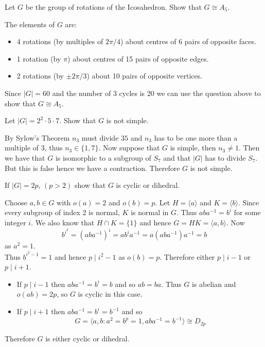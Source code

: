 \documentclass[12pt, answers]{exam}
\begin{document}
\begin{questions}
        \question Let $G$ be the group of rotations of the Icosahedron. Show that $G\cong A_5$.
        \begin{solution}
            The elements of $G$ are:
            \begin{itemize}
                \item 4 rotations (by multiples of $2\pi / 4$) about centres of 6 pairs of opposite faces.
                \item 1 rotation  (by $\pi$) about centres of 15 pairs of opposite edges.
                \item 2 rotations (by $\pm 2\pi / 3$) about 10 pairs of opposite vertices.
            \end{itemize}
            Since $|G| = 60$ and the number of 3 cycles is 20 we can use the question above to show that $G \cong A_5$.
        \end{solution}

        \question Let $|G| = 2^2 \cdot 5 \cdot 7$. Show that $G$ is not simple.
        \begin{solution}
            By Sylow's Theorem $n_3$ must divide $35$ and $n_3$ has to be one more than a multiple of 3, thus
            $n_3 \in \{ 1, 7 \}$. Now suppose that $G$ is simple, then $n_3 \neq 1$. Then we have that $G$ is isomorphic
            to a subgroup of $S_7$ and that $|G|$ has to divide $S_7$. But this is false hence we have a contraction. Therefore
            $G$ is not simple.
        \end{solution}

        \question If $|G| = 2p$, $(p > 2)$ show that $G$ is cyclic or dihedral.
        \begin{solution}
            Choose $a, b \in G$ with $o(a) = 2$ and $o(b) = p$. Let $H = \langle a \rangle$ and $K = \langle b \rangle$.
            Since every subgroup of index 2 is normal, $K$ is normal in $G$. Thus $aba^{-1} = b^i$ for some integer $i$.
            We also know that $H \cap K = \{1\}$ and hence $G = HK = \langle a, b \rangle$. Now
            \[ b^{i^2} = (aba^{-1})^{i} = ab^ia^{-1} = a(aba^{-1})a^{-1} = b\]
            as $a^2 = 1$.\\
            Thus $b^{i^2 - 1} = 1$ and hence $p \mathrel{|} i^2 - 1$ as $o(b) = p$. Therefore either $p \mathrel{|} i - 1$
            or $p \mathrel{|} i + 1$.
            \begin{itemize}
                \item If $p \mathrel{|} i - 1$ then $aba^{-1} = b^i = b$ and so $ab = ba$. Thus $G$ is abelian and
                $o(ab) = 2p$, so $G$ is cyclic in this case.
                \item If $p \mathrel{|} i + 1$ then $aba^{-1} = b^i = b^{-1}$ and so
                \[ G = \langle a, b \colon a^2 = b^p = 1, aba^{-1} = b^{-1} \rangle \cong D_{2p} \]
            \end{itemize}
            Therefore $G$ is either cyclic or dihedral.
        \end{solution}


\end{questions}
\end{document}
